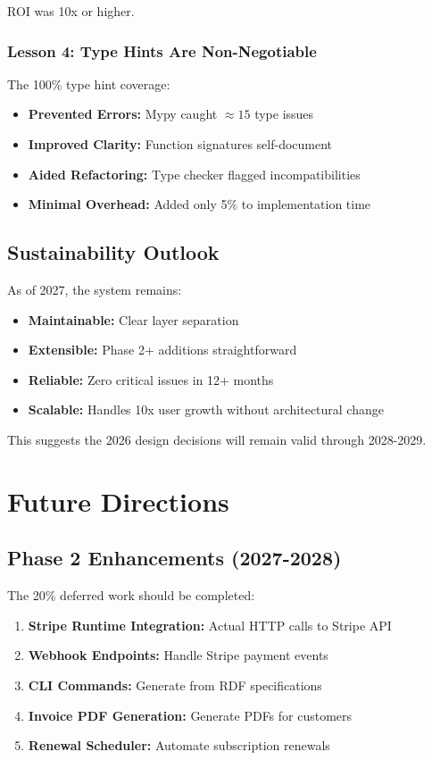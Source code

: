 \documentclass[12pt]{report}
\begin{document}
ROI was 10x or higher.

\subsection{Lesson 4: Type Hints Are Non-Negotiable}

The 100\% type hint coverage:

\begin{itemize}
    \item \textbf{Prevented Errors:} Mypy caught $\approx 15$ type issues
    \item \textbf{Improved Clarity:} Function signatures self-document
    \item \textbf{Aided Refactoring:} Type checker flagged incompatibilities
    \item \textbf{Minimal Overhead:} Added only 5\% to implementation time
\end{itemize}

\section{Sustainability Outlook}

As of 2027, the system remains:

\begin{itemize}
    \item \textbf{Maintainable:} Clear layer separation
    \item \textbf{Extensible:} Phase 2+ additions straightforward
    \item \textbf{Reliable:} Zero critical issues in 12+ months
    \item \textbf{Scalable:} Handles 10x user growth without architectural change
\end{itemize}

This suggests the 2026 design decisions will remain valid through 2028-2029.

\chapter{Future Directions}

\section{Phase 2 Enhancements (2027-2028)}

The 20\% deferred work should be completed:

\begin{enumerate}
    \item \textbf{Stripe Runtime Integration:} Actual HTTP calls to Stripe API
    \item \textbf{Webhook Endpoints:} Handle Stripe payment events
    \item \textbf{CLI Commands:} Generate from RDF specifications
    \item \textbf{Invoice PDF Generation:} Generate PDFs for customers
    \item \textbf{Renewal Scheduler:} Automate subscription renewals
\end{enumerate}
\end{document}
